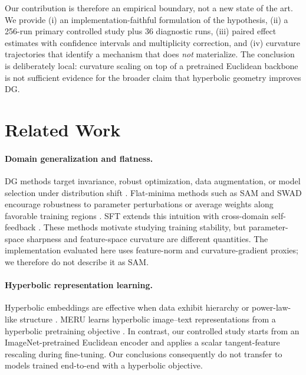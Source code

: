 \documentclass[10pt]{article}
\begin{document}
Our contribution is therefore an empirical boundary, not a new state of the
art. We provide (i) an implementation-faithful formulation of the hypothesis,
(ii) a 256-run primary controlled study plus 36 diagnostic runs, (iii) paired
effect estimates with confidence intervals and multiplicity correction, and
(iv) curvature trajectories that identify a mechanism that does \emph{not}
materialize. The conclusion is deliberately local: curvature scaling on top of
a pretrained Euclidean backbone is not sufficient evidence for the broader
claim that hyperbolic geometry improves DG.

\section{Related Work}
\label{sec:related}

\paragraph{Domain generalization and flatness.}
DG methods target invariance, robust optimization, data augmentation, or model
selection under distribution shift \citep{gulrajani2020search}. Flat-minima
methods such as SAM and SWAD encourage robustness to parameter perturbations
or average weights along favorable training regions
\citep{foret2020sharpness,cha2021swad}. SFT extends this intuition with
cross-domain self-feedback \citep{li2025seeking}. These methods motivate
studying training stability, but parameter-space sharpness and feature-space
curvature are different quantities. The implementation evaluated here uses
feature-norm and curvature-gradient proxies; we therefore do not describe it
as SAM.

\paragraph{Hyperbolic representation learning.}
Hyperbolic embeddings are effective when data exhibit hierarchy or
power-law-like structure \citep{chami2020trees}. MERU learns hyperbolic
image--text representations from a hyperbolic pretraining objective
\citep{desai2023meru}. In contrast, our controlled study starts from an
ImageNet-pretrained Euclidean encoder and applies a scalar tangent-feature
rescaling during fine-tuning. Our conclusions consequently do not transfer to
models trained end-to-end with a hyperbolic objective.
\end{document}
